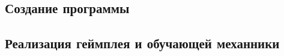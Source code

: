 \documentclass[coursework]{SCWorks}
\begin{document}
\subsection{Создание программы}


\subsection{Реализация геймплея и обучающей механники}

\conclusion

\nocite{*}




\appendix
\end{document}
